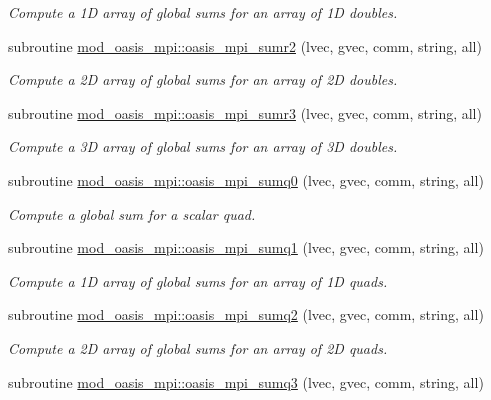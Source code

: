 \begin{DoxyCompactItemize}
\begin{DoxyCompactList}\small\item\em Compute a 1D array of global sums for an array of 1D doubles. \end{DoxyCompactList}\item 
subroutine \hyperlink{namespacemod__oasis__mpi_afbc665ae71c97d0b0467323cd86a5973}{mod\+\_\+oasis\+\_\+mpi\+::oasis\+\_\+mpi\+\_\+sumr2} (lvec, gvec, comm, string, all)
\begin{DoxyCompactList}\small\item\em Compute a 2D array of global sums for an array of 2D doubles. \end{DoxyCompactList}\item 
subroutine \hyperlink{namespacemod__oasis__mpi_a41836fe23aeb81e65b4d24f6f0c90953}{mod\+\_\+oasis\+\_\+mpi\+::oasis\+\_\+mpi\+\_\+sumr3} (lvec, gvec, comm, string, all)
\begin{DoxyCompactList}\small\item\em Compute a 3D array of global sums for an array of 3D doubles. \end{DoxyCompactList}\item 
subroutine \hyperlink{namespacemod__oasis__mpi_a2901cf7eaf807b4df7bd82aefadfeed9}{mod\+\_\+oasis\+\_\+mpi\+::oasis\+\_\+mpi\+\_\+sumq0} (lvec, gvec, comm, string, all)
\begin{DoxyCompactList}\small\item\em Compute a global sum for a scalar quad. \end{DoxyCompactList}\item 
subroutine \hyperlink{namespacemod__oasis__mpi_a4a81062f1345805cdd828552272670c8}{mod\+\_\+oasis\+\_\+mpi\+::oasis\+\_\+mpi\+\_\+sumq1} (lvec, gvec, comm, string, all)
\begin{DoxyCompactList}\small\item\em Compute a 1D array of global sums for an array of 1D quads. \end{DoxyCompactList}\item 
subroutine \hyperlink{namespacemod__oasis__mpi_aa9a5264e64523ff85ffb37ddc3b405ae}{mod\+\_\+oasis\+\_\+mpi\+::oasis\+\_\+mpi\+\_\+sumq2} (lvec, gvec, comm, string, all)
\begin{DoxyCompactList}\small\item\em Compute a 2D array of global sums for an array of 2D quads. \end{DoxyCompactList}\item 
subroutine \hyperlink{namespacemod__oasis__mpi_a3f989a76dbe1896764d73ffea933130d}{mod\+\_\+oasis\+\_\+mpi\+::oasis\+\_\+mpi\+\_\+sumq3} (lvec, gvec, comm, string, all)

\end{DoxyCompactItemize}
